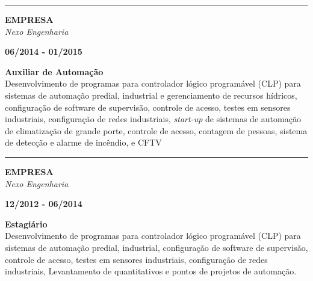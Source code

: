 \documentclass[12pt, a4paper]{article}
\newcommand{\LlinhaM}{1pt} 	 %
\newcommand{\TlinhaM}{17cm}		 %
\begin{document}
\begin{center}
	\rule{\TlinhaM}{\LlinhaM}
\end{center}

\begin{multicols}{2}
	\begin{flushleft}
		\textbf{EMPRESA}\\
		\textit{Nexo Engenharia}\\
	\end{flushleft}
	\vfill
	\begin{flushright}
		\textbf{06/2014 - 01/2015}\\
	\end{flushright}
\end{multicols}
\begin{flushleft}
	\textbf{Auxiliar de Automação}\\
	Desenvolvimento de programas para controlador lógico programável (CLP) para sistemas de automação predial, industrial e gerenciamento de recursos hídricos, configuração de software de supervisão, controle de acesso, testes em sensores industriais, configuração de redes industriais, \textit{start-up} de sistemas de automação de climatização de grande porte, controle de acesso, contagem de pessoas, sistema de detecção e alarme de incêndio, e CFTV\\
\end{flushleft}

\begin{center}
	\rule{\TlinhaM}{\LlinhaM}
\end{center}

\begin{multicols}{2}
	\begin{flushleft}
		\textbf{EMPRESA}\\
		\textit{Nexo Engenharia}\\
	\end{flushleft}
	\vfill
	\begin{flushright}
		\textbf{12/2012 - 06/2014}\\
	\end{flushright}
\end{multicols}
\begin{flushleft}
	\textbf{Estagiário}\\
	Desenvolvimento de programas para controlador lógico programável (CLP) para sistemas de automação predial, industrial, configuração de software de supervisão, controle de acesso, testes em sensores industriais, configuração de redes industriais, Levantamento de quantitativos e pontos de projetos de automação.\\
\end{flushleft}
\end{document}
